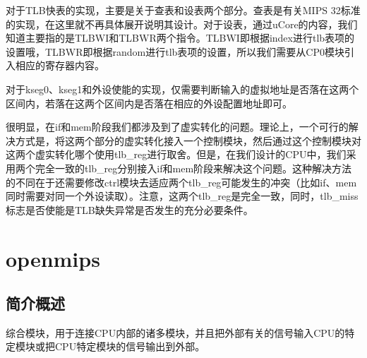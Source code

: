     对于TLB快表的实现，主要是关于查表和设表两个部分。查表是有关MIPS 32标准的实现，在这里就不再具体展开说明其设计。对于设表，通过uCore的内容，我们知道主要指的是TLBWI和TLBWR两个指令。TLBWI即根据index进行tlb表项的设置哦，TLBWR即根据random进行tlb表项的设置，所以我们需要从CP0模块引入相应的寄存器内容。

    对于kseg0、kseg1和外设使能的实现，仅需要判断输入的虚拟地址是否落在这两个区间内，若落在这两个区间内是否落在相应的外设配置地址即可。

    很明显，在if和mem阶段我们都涉及到了虚实转化的问题。理论上，一个可行的解决方式是，将这两个部分的虚实转化接入一个控制模块，然后通过这个控制模块对这两个虚实转化哪个使用tlb\_reg进行取舍。但是，在我们设计的CPU中，我们采用两个完全一致的tlb\_reg分别接入if和mem阶段来解决这个问题。这种解决方法的不同在于还需要修改ctrl模块去适应两个tlb\_reg可能发生的冲突（比如if、mem同时需要对同一个外设读取）。注意，这两个tlb\_reg是完全一致，同时，tlb\_miss标志是否使能是TLB缺失异常是否发生的充分必要条件。
    
\section{openmips}

    \subsection{简介概述}
    综合模块，用于连接CPU内部的诸多模块，并且把外部有关的信号输入CPU的特定模块或把CPU特定模块的信号输出到外部。
    
